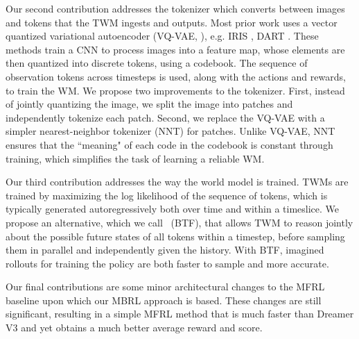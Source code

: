 Our second contribution addresses the tokenizer which converts between images and tokens that the TWM ingests and outputs.
Most prior work uses a vector quantized variational autoencoder (VQ-VAE, \citealt{van2017neural}), e.g.
IRIS \citep{micheli2022transformers},
DART \citep{agarwal2024learning}.
These methods train a CNN to process images into a 
feature map, whose elements are then quantized into discrete tokens, using a codebook. 
The sequence of observation tokens across timesteps is used, along with the actions and rewards, to train the WM.
We propose two improvements to the tokenizer.
First, instead of jointly quantizing the image, we split the image into patches and independently tokenize each patch.
Second, we replace the VQ-VAE with a simpler nearest-neighbor tokenizer (NNT) for patches. 
Unlike VQ-VAE, NNT ensures that the ``meaning" of each code in the codebook is constant through training, which simplifies the task of learning a reliable WM.

Our third contribution addresses the way the world model is trained.
TWMs are trained by maximizing the log likelihood of the sequence of tokens,
which is typically generated autoregressively both over time and within a timeslice.
We propose an alternative, 
which we call \btf ~(BTF),
that allows TWM to reason jointly about the possible future states of all tokens within a timestep, before sampling them in parallel and independently given the history.
With BTF, imagined rollouts for training the policy are both faster to sample and more accurate.


Our final contributions are some minor architectural changes to the MFRL baseline upon which our MBRL
approach is based. These changes are still significant, resulting in a simple MFRL method that is much faster than Dreamer V3 and yet obtains a much better average reward and score.

